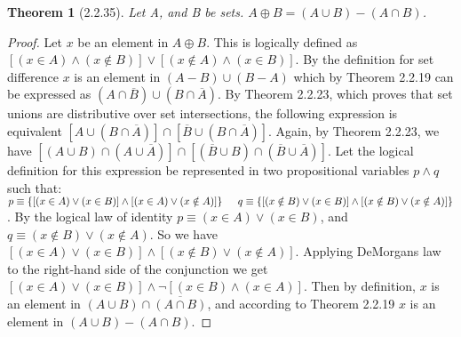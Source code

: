 \documentclass[a4paper, 12pt]{article}
\theoremstyle{plain}
\newtheorem*{theorem*}{Theorem}
\begin{document}
	
	\begin{theorem*}[2.2.35]
		Let A, and B be sets. $A \oplus B = (A \cup B) - (A \cap B)$.
	\end{theorem*}
	
	\begin{proof}
		Let $x$ be an element in $A \oplus B$. This is logically defined as \newline $[(x \in A) \land (x \notin B)] \lor [(x \notin A) \land (x \in B)]$. By the definition for set difference $x$ is an element in $(A - B) \cup (B - A)$ which by Theorem 2.2.19 can be expressed as 
		$(A \cap \overline{B}) \cup (B \cap \overline{A})$. By Theorem 2.2.23, which proves that set unions are distributive over set intersections, the following expression is equivalent $[A \cup (B \cap \overline{A})] \cap [\overline{B} \cup (B \cap \overline{A})]$. Again, by Theorem 2.2.23, we have $[(A \cup B) \cap (A \cup \overline{A})] \cap [(\overline{B} \cup B) \cap (\overline{B} \cup \overline{A})]$. Let the logical definition for this expression be represented in two propositional variables $p \land q$ such that: \newline \indent $p \equiv \{[(x \in A) \lor (x \in B)] \land [(x \in A) \lor (x \notin A)]\} \newline \indent q \equiv \{[(x \notin B) \lor (x \in B)] \land [(x \notin B) \lor (x \notin A)]\}$. \newline By the logical law of identity $p \equiv (x \in A) \lor (x \in B)$, and \newline $q \equiv (x \notin B) \lor (x \notin A)$. So we have $[(x \in A) \lor (x \in B)] \land [(x \notin B) \lor (x \notin A)]$. Applying DeMorgans law to the right-hand side of the conjunction we get \newline $[(x \in A) \lor (x \in B)] \land \lnot [(x \in B) \land (x \in A)]$. Then by  definition, $x$ is an element in $(A \cup B) \cap \overline{(A \cap B)}$, and according to Theorem 2.2.19 $x$ is an element in $(A \cup B) - (A \cap B)$.
		

\end{proof}
\end{document}
